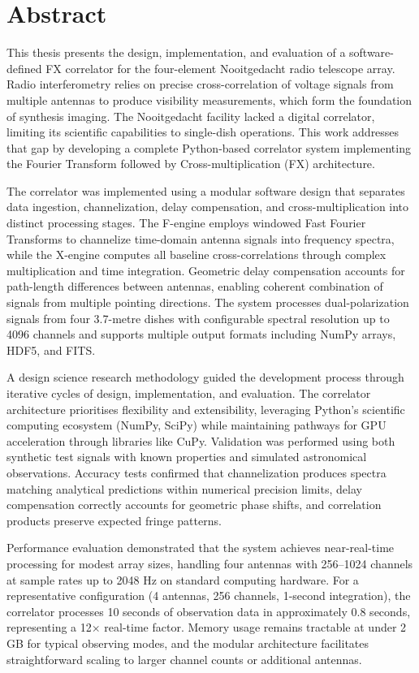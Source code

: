 \chapter*{Abstract}

This thesis presents the design, implementation, and evaluation of a software-defined FX correlator for the four-element Nooitgedacht radio telescope array. Radio interferometry relies on precise cross-correlation of voltage signals from multiple antennas to produce visibility measurements, which form the foundation of synthesis imaging. The Nooitgedacht facility lacked a digital correlator, limiting its scientific capabilities to single-dish operations. This work addresses that gap by developing a complete Python-based correlator system implementing the Fourier Transform followed by Cross-multiplication (FX) architecture.

The correlator was implemented using a modular software design that separates data ingestion, channelization, delay compensation, and cross-multiplication into distinct processing stages. The F-engine employs windowed Fast Fourier Transforms to channelize time-domain antenna signals into frequency spectra, while the X-engine computes all baseline cross-correlations through complex multiplication and time integration. Geometric delay compensation accounts for path-length differences between antennas, enabling coherent combination of signals from multiple pointing directions. The system processes dual-polarization signals from four 3.7-metre dishes with configurable spectral resolution up to 4096 channels and supports multiple output formats including NumPy arrays, HDF5, and FITS.

A design science research methodology guided the development process through iterative cycles of design, implementation, and evaluation. The correlator architecture prioritises flexibility and extensibility, leveraging Python's scientific computing ecosystem (NumPy, SciPy) while maintaining pathways for GPU acceleration through libraries like CuPy. Validation was performed using both synthetic test signals with known properties and simulated astronomical observations. Accuracy tests confirmed that channelization produces spectra matching analytical predictions within numerical precision limits, delay compensation correctly accounts for geometric phase shifts, and correlation products preserve expected fringe patterns.

Performance evaluation demonstrated that the system achieves near-real-time processing for modest array sizes, handling four antennas with 256–1024 channels at sample rates up to 2048 Hz on standard computing hardware. For a representative configuration (4 antennas, 256 channels, 1-second integration), the correlator processes 10 seconds of observation data in approximately 0.8 seconds, representing a 12× real-time factor. Memory usage remains tractable at under 2 GB for typical observing modes, and the modular architecture facilitates straightforward scaling to larger channel counts or additional antennas.

